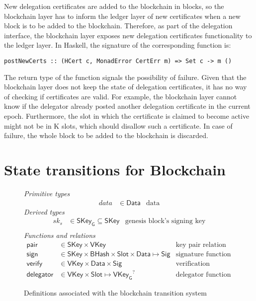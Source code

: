 \documentclass[11pt,a4paper]{article}
\newcommand{\fun}[1]{\mathsf{#1}}
\newcommand{\type}[1]{\mathsf{#1}}
\newcommand{\BHash}{\type{BHash}}  %
\newcommand{\Slot}{\type{Slot}}
\newcommand{\SKey}{\type{SKey}}
\newcommand{\SKeyGen}{\type{SKey_G}}
\newcommand{\VKey}{\type{VKey}}
\newcommand{\VKeyGen}{\type{VKey_G}}
\newcommand{\Sig}{\type{Sig}}
\newcommand{\Data}{\type{Data}}
\newcommand{\signname}{sign}
\newcommand{\verifyname}{verify}
\newcommand{\keypairname}{pair}
\newcommand{\delegatorname}{delegator} %
\newcommand{\partialf}{\mapsto}
\begin{document}
New delegation certificates are added to the blockchain in blocks, so the
blockchain layer has to inform the ledger layer of new certificates when a new
block is to be added to the blockchain.
%
Therefore, as part of the delegation interface, the blockchain layer exposes
new delegation certificates functionality to the ledger layer.
%
In Haskell, the signature of the corresponding function is:
%
\begin{lstlisting}
postNewCerts :: (HCert c, MonadError CertErr m) => Set c -> m ()
\end{lstlisting}
%
The return type of the function signals the possibility of failure.
%
Given that the blockchain layer does not keep the state of delegation
certificates, it has no way of checking if certificates are valid.
%
For example, the blockchain layer cannot know if the delegator already posted
another delegation certificate in the current epoch.
%
Furthermore, the slot in which the certificate is claimed to become active
might not be in K slots, which should disallow such a certificate.
%
In case of failure, the whole block to be added to the blockchain is
discarded.


\section{State transitions for Blockchain}
\label{sec:state-trans-chain}

\begin{figure}[h]
  \emph{Primitive types}
  \begin{align*}
  data & \in \Data    & \text{data}
  \end{align*}
  \emph{Derived types}
  \begin{align*}
    sk_s & \in \SKeyGen \subseteq \SKey & \text{genesis block's signing key}\\
  \end{align*}
  \emph{Functions and relations}
  \begin{align*}
    \text{$\fun{\keypairname}$} & \in \SKey \times \VKey & \text{key pair relation}\\
    \text{$\fun{\signname}$} & \in \SKey \times \BHash \times \Slot \times \Data \partialf \Sig
      & \text{signature function}\\
    \text{$\fun{\verifyname}$} & \in \VKey \times \Data \times \Sig
      & \text{verification relation}\\
    \text{$\fun{\delegatorname}$} & \in \VKey \times \Slot \partialf \VKeyGen^?
      & \text{delegator function}
  \end{align*}
  \caption{Definitions associated with the blockchain transition system}
  \label{fig:state-trans-abstract}
\end{figure}
\end{document}
